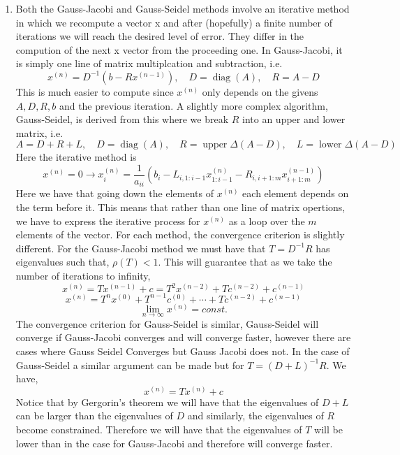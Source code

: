 \documentclass{article}
\DeclareMathOperator{\diag}{diag}
\DeclareMathOperator{\upper}{upper}
\DeclareMathOperator{\lowtri}{lower}
\begin{document}
    \begin{enumerate}

        \item Both the Gauss-Jacobi and Gauss-Seidel methods involve an iterative method in which we recompute a vector x and after (hopefully) a finite number of iterations we will reach the desired level of error. They differ in the compution of the next x vector from the proceeding one. In Gauss-Jacobi, it is simply one line of matrix multiplcation and subtraction, i.e.
    \[
        x^{(n)} = D^{-1}(b - Rx^{(n-1)}), \quad D = \diag(A), \quad R = A - D
    \]
    This is much easier to compute since $x^{(n)}$ only depends on the givens $A, D, R, b$ and the previous iteration. A slightly more complex algorithm, Gauss-Seidel, is derived from this where we break $R$ into an upper and lower matrix, i.e.
    \[
        A = D + R + L, \quad D = \diag(A), \quad R = \upper\Delta(A - D), \quad L = \lowtri\Delta(A - D)    
    \]
    Here the iterative method is 
    \[
        x^{(n)} = 0 \to x_i^{(n)} = \frac{1}{a_{ii}}(b_i - L_{i, 1:i-1}x_{1:i-1}^{(n)} - R_{i, i+1:m}x_{i+1:m}^{(n-1)})
    \]
    Here we have that going down the elements of $x^{(n)}$ each element depends on the term before it. This means that rather than one line of matrix opertions, we have to express the iterative process for $x^{(n)}$ as a loop over the $m$ elements of the vector. For each method, the convergence criterion is slightly different. For the Gauss-Jacobi method we must have that $T = D^{-1}R$ has eigenvalues such that, $\rho(T) < 1$. This will guarantee that as we take the number of iterations to infinity, 
    \[
        x^(n) = Tx^{(n-1)} + c = T^2x^{(n-2)} + Tc^{(n-2)} + c^{(n-1)}
    \]
    \[
        x^{(n)} = T^{n}x^{(0)} + T^{n-1}c^{(0)} + \cdots + Tc^{(n-2)} + c^{(n-1)}
    \]
    \[
        \lim_{n\to\infty} x^{(n)} = const.
    \]
    The convergence criterion for Gauss-Seidel is similar, Gauss-Seidel will converge if Gauss-Jacobi converges and will converge faster, however there are cases where Gauss Seidel Converges but Gauss Jacobi does not. In the case of Gauss-Seidel a similar argument can be made but for $T = (D + L)^{-1}R$. We have, 
    \[
        x^{(n)} = Tx^{(n)} + c
    \]
    Notice that by Gergorin's theorem we will have that the eigenvalues of $D + L$ can be larger than the eigenvalues of $D$ and similarly, the eigenvalues of $R$ become constrained. Therefore we will have that the eigenvalues of $T$ will be lower than in the case for Gauss-Jacobi and therefore will converge faster. 


\end{enumerate}
\end{document}
